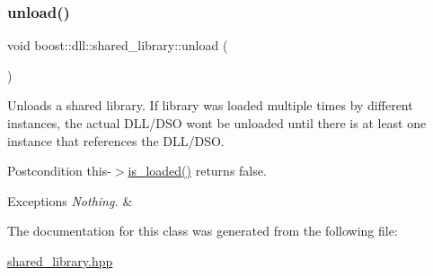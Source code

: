\subsubsection{\texorpdfstring{unload()}{unload()}}
{\footnotesize\ttfamily void boost\+::dll\+::shared\+\_\+library\+::unload (\begin{DoxyParamCaption}{ }\end{DoxyParamCaption})\hspace{0.3cm}{\ttfamily [inline]}}

Unloads a shared library. If library was loaded multiple times by different instances, the actual D\+L\+L/\+D\+SO won\textquotesingle{}t be unloaded until there is at least one instance that references the D\+L\+L/\+D\+SO.

\begin{DoxyPostcond}{Postcondition}
this-\/$>$\hyperlink{a01708_a31ec32c213665bd151f2c615f89f94ef}{is\+\_\+loaded()} returns false. 
\end{DoxyPostcond}

\begin{DoxyExceptions}{Exceptions}
{\em Nothing.} & \\
\hline
\end{DoxyExceptions}


The documentation for this class was generated from the following file\+:\begin{DoxyCompactItemize}
\item 
\hyperlink{a00269}{shared\+\_\+library.\+hpp}\end{DoxyCompactItemize}
